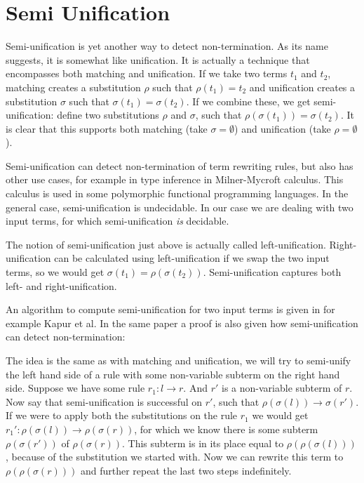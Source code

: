\chapter{Semi Unification}\label{semi-unification}
Semi-unification is yet another way to detect non-termination. As its name suggests, it is somewhat like unification. It is actually a technique that encompasses both matching and unification. If we take two terms $t_1$ and $t_2$, matching creates a substitution $\rho$ such that $\rho(t_1) = t_2$ and unification creates a substitution $\sigma$ such that $\sigma(t_1) = \sigma(t_2)$. If we combine these, we get semi-unification: define two substitutions $\rho$ and $\sigma$, such that $\rho(\sigma(t_1)) = \sigma(t_2)$. It is clear that this supports both matching (take $\sigma = \emptyset$) and unification (take $\rho = \emptyset$). 

Semi-unification can detect non-termination of term rewriting rules, but also has other use cases, for example in type inference in Milner-Mycroft calculus\cite{Henglein:1988}. This calculus is used in some polymorphic functional programming languages. In the general case, semi-unification is undecidable\cite{KFOURY:1993}. In our case we are dealing with two input terms, for which semi-unification \textit{is} decidable.

The notion of semi-unification just above is actually called left-unification. Right-unification can be calculated using left-unification if we swap the two input terms, so we would get $\sigma(t_1) = \rho(\sigma(t_2))$. Semi-unification captures both left- and right-unification.

An algorithm to compute semi-unification for two input terms is given in for example Kapur et al\cite{SemiUnification}. In the same paper a proof is also given how semi-unification can detect non-termination:

The idea is the same as with matching and unification, we will try to semi-unify the left hand side of a rule with some non-variable subterm on the right hand side. Suppose we have some rule $r_1: l \rightarrow r$. And $r'$ is a non-variable subterm of $r$. Now say that semi-unification is successful on $r'$, such that $\rho(\sigma(l)) \rightarrow \sigma(r')$. If we were to apply both the substitutions on the rule $r_1$ we would get $r_1': \rho(\sigma(l)) \rightarrow \rho(\sigma(r))$, for which we know there is some subterm $\rho(\sigma(r'))$ of $\rho(\sigma(r))$. This subterm is in its place equal to $\rho(\rho(\sigma(l)))$, because of the substitution we started with. Now we can rewrite this term to $\rho(\rho(\sigma(r)))$ and further repeat the last two steps indefinitely.

